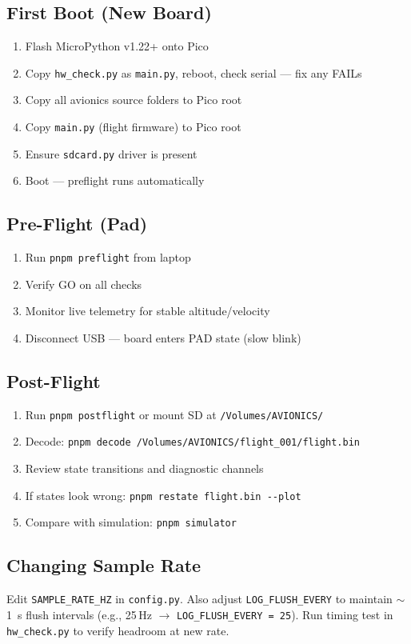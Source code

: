 \documentclass[11pt, a4paper, twoside]{article}
\newcommand{\config}[1]{\texttt{#1}}
\newcommand{\file}[1]{\texttt{#1}}
\begin{document}
\subsection{First Boot (New Board)}
\begin{enumerate}
    \item Flash MicroPython v1.22+ onto Pico
    \item Copy \file{hw\_check.py} as \file{main.py}, reboot, check serial --- fix any FAILs
    \item Copy all avionics source folders to Pico root
    \item Copy \file{main.py} (flight firmware) to Pico root
    \item Ensure \file{sdcard.py} driver is present
    \item Boot --- preflight runs automatically
\end{enumerate}

\subsection{Pre-Flight (Pad)}
\begin{enumerate}
    \item Run \texttt{pnpm preflight} from laptop
    \item Verify GO on all checks
    \item Monitor live telemetry for stable altitude/velocity
    \item Disconnect USB --- board enters PAD state (slow blink)
\end{enumerate}

\subsection{Post-Flight}
\begin{enumerate}
    \item Run \texttt{pnpm postflight} or mount SD at \texttt{/Volumes/AVIONICS/}
    \item Decode: \texttt{pnpm decode /Volumes/AVIONICS/flight\_001/flight.bin}
    \item Review state transitions and diagnostic channels
    \item If states look wrong: \texttt{pnpm restate flight.bin -{}-plot}
    \item Compare with simulation: \texttt{pnpm simulator}
\end{enumerate}

\subsection{Changing Sample Rate}
Edit \config{SAMPLE\_RATE\_HZ} in \file{config.py}. Also adjust \config{LOG\_FLUSH\_EVERY} to maintain $\sim$\SI{1}{\second} flush intervals (e.g., 25\,Hz $\to$ \texttt{LOG\_FLUSH\_EVERY = 25}). Run timing test in \file{hw\_check.py} to verify headroom at new rate.
\end{document}
